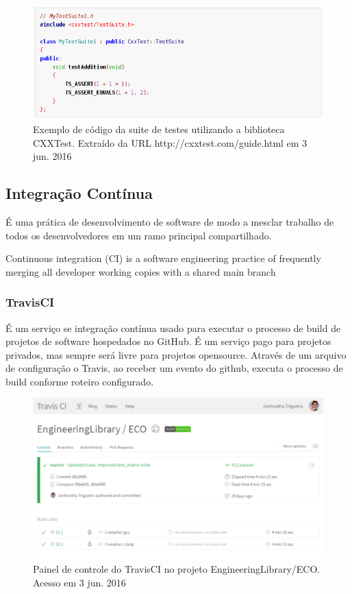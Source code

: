 \documentclass[
	article,			%
	12pt,				%
	oneside,			%
	a4paper,			%
	english,			
	brazil,
	sumario=tradicional
	]{abntex2}
\begin{document}
\begin{figure}[!h]
\centering
\includegraphics[scale=0.4]{images/cxxtest_simpletest.png}
\caption{Exemplo de código da suite de testes utilizando a biblioteca CXXTest. Extraído da URL http://cxxtest.com/guide.html em 3 jun. 2016}
\label{cxxtest_simpletest}
\end{figure}

\pagebreak
\subsection{Integração Contínua}
É uma prática de desenvolvimento de software de modo a mesclar trabalho de todos os desenvolvedores em um ramo principal compartilhado.

\begin{citacao}
Continuous  integration  (CI)  is  a  software  engineering practice of frequently merging all developer working copies with  a  shared  main  branch
	\cite[Introduction]{vasilescu2015continuous}
\end{citacao}

\subsubsection{TravisCI}
É um serviço se integração contínua usado para executar o processo de build de projetos de software hospedados no GitHub. É um serviço pago para projetos privados, mas sempre será livre para projetos opensource. 
Através de um arquivo de configuração o Travis, ao receber um evento do github, executa o processo de build conforme roteiro configurado.

\begin{figure}[!h]
\centering
\includegraphics[scale=0.4]{images/travisci_dashboard.png}
\caption{Painel de controle do TravisCI no projeto EngineeringLibrary/ECO. Acesso em 3 jun. 2016}
\label{travisci_dashboard}
\end{figure}
\end{document}
